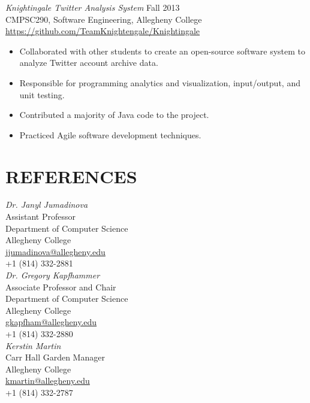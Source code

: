 \documentclass[margin]{res}
\begin{document}
\begin{resume}
                {\sl Knightingale Twitter Analysis System} \hfill Fall 2013 \\
                CMPSC290, Software Engineering, Allegheny College \\
                \url{https://github.com/TeamKnightengale/Knightingale}
                 \begin{itemize}  \itemsep -2pt %
                    \item Collaborated with other students to create an open-source software system to analyze Twitter account archive data.
                    \item Responsible for programming analytics and visualization, input/output, and unit testing.
                    \item Contributed a majority of Java code to the project.
                    \item Practiced Agile software development techniques.
                \end{itemize}

\section{REFERENCES}
{\sl Dr. Janyl Jumadinova} \hfill \\
Assistant Professor \\ Department of Computer Science \\ Allegheny College \\
\url{jjumadinova@allegheny.edu} \\
+1 (814) 332-2881 \\

{\sl Dr. Gregory Kapfhammer} \hfill \\
Associate Professor and Chair \\ Department of Computer Science \\ Allegheny College \\
\url{gkapfham@allegheny.edu} \\
+1 (814) 332-2880\\

{\sl Kerstin Martin} \hfill \\
Carr Hall Garden Manager \\ Allegheny College \\
\url{kmartin@allegheny.edu} \\
+1 (814) 332-2787\\


\end{resume} 
\end{document}
